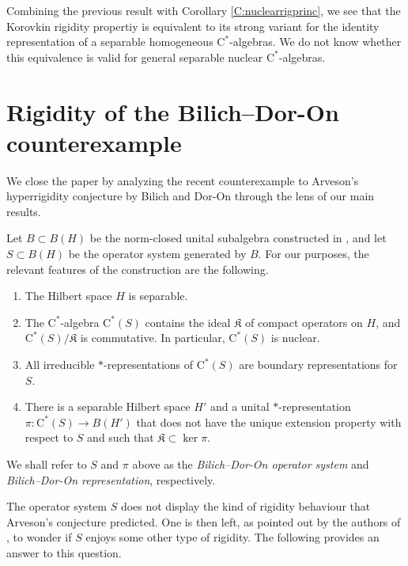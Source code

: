 \documentclass[10pt]{amsart}
\newcommand{\fK}{{\mathfrak{K}}}
\newcommand{\rC}{\mathrm{C}}
\theoremstyle{definition}
\begin{document}
Combining the previous result with Corollary \ref{C:nuclearrigprinc}, we see that the Korovkin rigidity propertiy is equivalent to its strong variant for the identity representation of a separable homogeneous $\rC^*$-algebras. We do not know whether this equivalence is valid for general separable nuclear $\rC^*$-algebras. 






\section{Rigidity of the Bilich--Dor-On counterexample}


We close the paper by analyzing the recent counterexample to Arveson's hyperrigidity conjecture by Bilich and Dor-On through the lens of our main results. 

Let $B\subset B(H)$ be the norm-closed unital subalgebra constructed in \cite{bilich2024arveson}, and let $S\subset B(H)$ be the operator system generated by $B$. For our purposes, the relevant features of the construction are the following.
\begin{enumerate}
\item The Hilbert space $H$ is separable.
\item The $\rC^*$-algebra $\rC^*(S)$ contains the ideal $\fK$  of compact operators on $H$, and $\rC^*(S)/\fK$ is commutative. In particular, $\rC^*(S)$ is nuclear.
\item All irreducible $*$-representations of $\rC^*(S)$ are boundary representations for $S$.
\item There is a separable Hilbert space $H'$ and a unital $*$-representation $\pi:\rC^*(S)\to B(H')$ that does not have the unique extension property with respect to $S$ and such that $\fK\subset \ker \pi$.
\end{enumerate}
We shall refer to $S$ and $\pi$ above as the \emph{Bilich--Dor-On operator system} and \emph{Bilich--Dor-On representation}, respectively.


The operator system $S$ does not display the kind of rigidity behaviour that Arveson's conjecture predicted. One is then left, as pointed out by the authors of \cite{bilich2024arveson}, to wonder if $S$ enjoys some other type of rigidity. The following provides an answer to this question.
\end{document}
